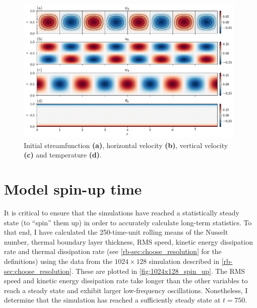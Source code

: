 \documentclass[../main.tex]{subfiles}
\begin{document}
\begin{figure}[ht]
    \centering
    \includegraphics[width=\linewidth]{figures/init.pdf}
    \caption{
        Initial streamfunction \textbf{(a)}, horizontal velocity \textbf{(b)},
        vertical velocity \textbf{(c)} and temperature \textbf{(d)}.
    }
    \label{fig:init}
\end{figure}


\section{Model spin-up time} \label{sec:spinup}
It is critical to ensure that the simulations have reached a statistically
steady state (to ``spin'' them up) in order to accurately calculate long-term
statistics. To that end, I have calculated the 250-time-unit rolling means of
the Nusselt number, thermal boundary layer thickness, RMS speed, kinetic energy
dissipation rate and thermal dissipation rate (see
\cref{rb-sec:choose_resolution} for the definitions) using the data from the
$1024 \times 128$ simulation described in \cref{rb-sec:choose_resolution}.
These are plotted in \cref{fig:1024x128_spin_up}. The RMS speed and kinetic
energy dissipation rate take longer than the other variables to reach a steady
state and exhibit larger low-frequency oscillations. Nonetheless, I determine
that the simulation has reached a sufficiently steady state at $t = 750$.
\end{document}
